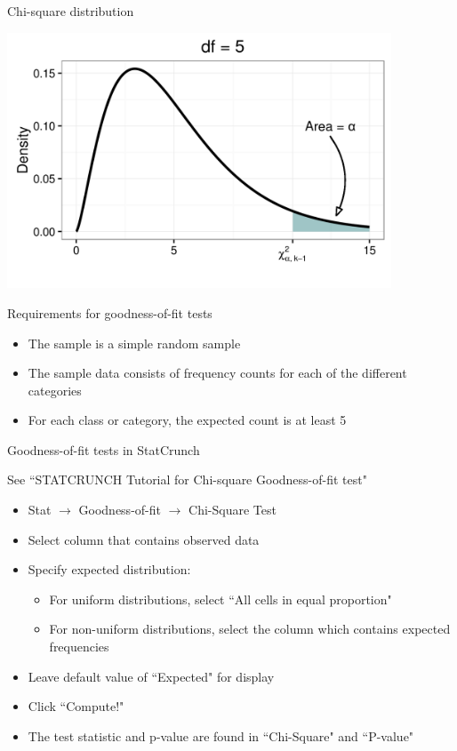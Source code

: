 \documentclass[xcolor=table]{beamer}
\begin{document}
\begin{frame}{Chi-square distribution}
\bigskip
{\centering
\includegraphics[width=4.5in]{../images/ch11_chi_square_crit}
\par}
\end{frame}



\begin{frame}{Requirements for goodness-of-fit tests}
\begin{block}{}
\large
\begin{itemize}
\item The sample is a simple random sample
\pause\item The sample data consists of frequency counts for each of the different categories
\pause\item For each class or category, the expected count is at least 5 
\end{itemize}
\end{block}
\end{frame}


\begin{frame}{Goodness-of-fit tests in StatCrunch}
\begin{alertblock}{}
See ``STATCRUNCH Tutorial for Chi-square Goodness-of-fit test"
\end{alertblock}

\begin{block}{}
\begin{itemize}
\item Stat $\to$ Goodness-of-fit $\to$ Chi-Square Test
\item Select column that contains observed data
\item Specify expected distribution:
\begin{itemize}
\item For uniform distributions, select ``All cells in equal proportion"
\item For non-uniform distributions, select the column which contains expected frequencies
\end{itemize}
\item Leave default value of ``Expected" for display
\item Click ``Compute!"
\item The test statistic and p-value are found in ``Chi-Square" and ``P-value"
\end{itemize}
\end{block}
\end{frame}
\end{document}
